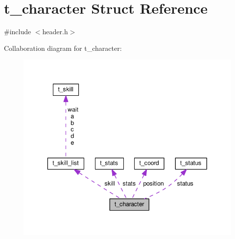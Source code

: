 \hypertarget{structt__character}{\section{t\-\_\-character Struct Reference}
\label{structt__character}
}


{\ttfamily \#include $<$header.\-h$>$}



Collaboration diagram for t\-\_\-character\-:\nopagebreak
\begin{figure}[H]
\begin{center}
\leavevmode
\includegraphics[width=343pt]{structt__character__coll__graph}
\end{center}
\end{figure}
